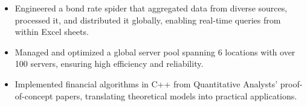 \begin{itemize}
  \item Engineered a bond rate spider that aggregated data from diverse sources, processed it, and distributed it globally, enabling real-time queries from within Excel sheets.
  \item Managed and optimized a global server pool spanning 6 locations with over 100 servers, ensuring high efficiency and reliability.
  \item Implemented financial algorithms in C++ from Quantitative Analysts' proof-of-concept papers, translating theoretical models into practical applications.
\end{itemize}
\divider
